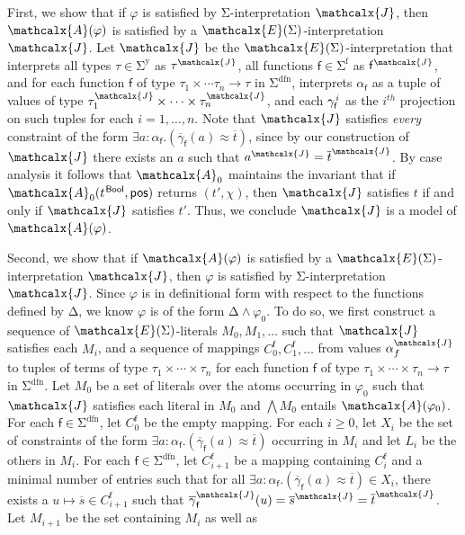 \documentclass[runningheads,a4paper]{llncs}
\newcommand\DDD{\Delta}
\newcommand{\con}[1]{\mathsf{#1}}
\renewcommand\vec[1]{\overline{#1}}
\let\oldSigma=\Sigma
\def\Sigma{\mathrm{\oldSigma}}
\let\oldDelta=\Delta
\def\Delta{\mathrm{\oldDelta}}
\let\oldwedge=\wedge
\def\wedge{\mathrel{\oldwedge}}
\newcommand{\teq}{\approx}
\newcommand{\I}{\mathcalx{J}} %
\newcommand{\J}{\mathcalx{J}}
\newcommand{\conv}{\mathcalx{A}}
\newcommand{\ssorts}[1]{#1^\mathrm{y}}
\newcommand{\sfuns}[1]{#1^\mathrm{f}}
\newcommand{\sfundefs}[1]{#1^\mathrm{dfn}}
\newcommand{\ppos}{\con{pos}}
\newcommand\ty[1]{\con{#1}}
\newcommand{\Bool}{\ty{Bool}}
\newcommand\concret{\gamma} %
\newcommand{\vecfarg}[1]{\vec{\concret}_{#1}}
\newcommand{\fargx}[2]{\concret^{\vthinspace#2}_{#1}}
\newcommand{\fargsort}[1]{\alpha_{#1}}
\newcommand{\extendsig}[1]{\mathcalx{E}( #1 )}
\newcommand{\vthinspace}{\kern+0.083333em}
\newcommand{\typ}[1]{^{\vthinspace #1}}
\begin{document}
\begin{proofsketch}
First, we show that if $\varphi$ is satisfied by $\Sigma$-interpretation $\I$, then $\conv( \varphi )$ is satisfied by a $\extendsig{\Sigma}$-interpretation $\J$.
Let $\J$ be the $\extendsig{\Sigma}$-interpretation that interprets all types $\tau \in \ssorts{\Sigma}$ as $\tau^\I$,
all functions $\con{f} \in \sfuns{\Sigma}$ as $\con{f}^\I$,
and for each function $\con{f}$ of type $\tau_1 \times \cdots \tau_n \rightarrow \tau$ in $\sfundefs{\Sigma}$,
interprets $\fargsort{\con{f}}$ as a tuple of values of type $\tau_1^\I \times \cdots \times \tau_n^\I$,
and each $\fargx{\con{f}}{i}$ as the $i^{th}$ projection on such tuples for each $i = 1, \ldots, n$.
Note that $\J$ satisfies \emph{every} constraint of the form $\exists a : {\fargsort{\con{f}}}. ( \vecfarg{\con{f}}( a ) \teq \vec t )$,
since by our construction of $\J$ there exists an $a$ such that $a^\J = \vec t^\J$.
By case analysis it follows that $\conv_0$ maintains the invariant that
if $\conv_0( t\typ{\Bool}, \ppos )$ returns $( {t'}, \chi )$,
then $\I$ satisfies $t$ if and only if $\J$ satisfies $t'$.
Thus, we conclude $\J$ is a model of $\conv( \varphi )$.

Second, we show that if $\conv( \varphi )$ is satisfied by a
$\extendsig{\Sigma}$-interpretation $\I$, then $\varphi$ is satisfied by
$\Sigma$-interpretation $\J$. Since $\varphi$ is in definitional form with
respect to the functions defined by $\DDD$, we know $\varphi$ is of the form
$\DDD \wedge \varphi_0$. 
To do so, 
we first construct a sequence of $\extendsig{\Sigma}$-literals $M_0, M_1, \ldots$ such that $\I$ satisfies each $M_i$,
and a sequence of mappings $C^{\con f}_0, C^{\con f}_1, \ldots$ from values $\fargsort{f}^\I$ 
to tuples of terms of type $\tau_1 \times \cdots \times \tau_n$ 
for each function $\con{f}$ of type $\tau_1 \times \cdots \times \tau_n \rightarrow \tau$ in $\sfundefs{\Sigma}$.
Let $M_0$ be a set of literals over the atoms occurring in $\varphi_0$
such that $\I$ satisfies each literal in $M_0$ and $\bigwedge M_0$ entails $\conv( \varphi_0 )$.
For each $\con{f} \in \sfundefs{\Sigma}$, let $C^{\con{f}}_0$ be the empty mapping.
For each $i \geq 0$, 
let $X_i$ be the set of constraints of the form $\exists a : {\fargsort{\con{f}}}. ( \vecfarg{\con{f}}( a ) \teq \vec t )$ occurring in $M_i$
and let $L_i$ be the others in $M_i$.
For each $\con{f} \in \sfundefs{\Sigma}$, let $C^{\con{f}}_{i+1}$ be a mapping containing $C^{\con{f}}_i$ and a minimal number of entries
such that for all $\exists a : {\fargsort{\con{f}}}. ( \vecfarg{\con{f}}( a ) \teq \vec t ) \in X_i$,
there exists a $u \mapsto \vec s \in C^{\con{f}}_{i+1}$ such that $\vecfarg{\con{f}}^\I( u ) = \vec s^\I = \vec t^\I$.
Let $M_{i+1}$ be the set containing $M_i$ as well as



\end{proofsketch}
\end{document}
